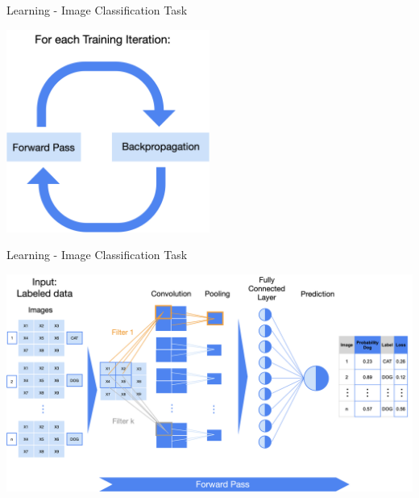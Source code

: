 \documentclass[11pt,compress,t,notes=noshow, xcolor=table]{beamer}
\begin{document}
\begin{vbframe}{Learning - Image Classification Task}
\vspace{0.5cm}
\begin{center}
    \includegraphics[width = 0.5\textwidth]{figure_man/nutshell-nn-learning-iteration.png}   
\end{center}

\end{vbframe}

\begin{vbframe}{Learning - Image Classification Task}
\vspace{0.5cm}
\begin{center}
   \includegraphics[width = \textwidth]{figure_man/nutshell-nn-learning-forwardpass.png}    
\end{center}
 
\end{vbframe}
\end{document}

